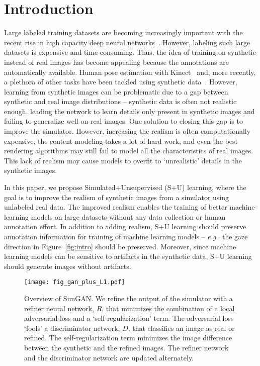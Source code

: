 \documentclass[10pt,twocolumn,letterpaper]{article}
\makeatletter
\DeclareRobustCommand\onedot{\futurelet\@let@token\@onedot}
\def\@onedot{\ifx\@let@token.\else.\null\fi\xspace}
\def\eg{\emph{e.g}\onedot} \def\Eg{\emph{E.g}\onedot}
\makeatother
\begin{document}
\section{Introduction}

Large labeled training datasets are becoming increasingly important with the recent rise in high capacity deep neural networks~\cite{imagenet_cvpr09, mscoco, ZhangLL16, ZhangLL16, youtub8M_16, Nagaraja2016, openimages}.
However, labeling such large datasets is expensive and time-consuming.
Thus, the idea of training on synthetic instead of real images has become appealing because the annotations are automatically available. 
Human pose estimation with Kinect~\cite{Shotton13} and, more recently, a plethora of other tasks have been tackled using synthetic data~\cite{Wood16,Wang15,qiu2016unrealcv,Shafaei16}.
However, learning from synthetic images can be problematic due to a gap between synthetic and real image distributions -- synthetic data is often not realistic enough, leading the network to learn details only present in synthetic images and failing to generalize well on real images.
One solution to closing this gap is to improve the simulator.
However, increasing the realism is often computationally expensive, the content modeling takes a lot of hard work, and even the best rendering algorithms may still fail to model all the characteristics of real images. 
This lack of realism may cause models to overfit to `unrealistic' details in the synthetic images.

In this paper, we propose Simulated+Unsupervised (S+U) learning, where the goal is to improve the realism of synthetic images from a simulator using unlabeled real data.
The improved realism enables the training of better machine learning models on large datasets without any data collection or human annotation effort. 
In addition to adding realism, S+U learning should preserve annotation information for training of machine learning models -- \eg the gaze direction in Figure~\ref{fig:intro} should be preserved.
Moreover, since machine learning models can be sensitive to artifacts in the synthetic data, S+U learning should generate images without artifacts.

\begin{figure}
\centering
\texttt{[image: fig\_gan\_plus\_L1.pdf]}
\caption{Overview of SimGAN. 
We refine the output of the simulator with a refiner neural network, $R$, that minimizes the combination of a local adversarial loss and a `self-regularization' term. 
The adversarial loss `fools' a discriminator network, $D$, that classifies an image as real or refined. 
The self-regularization term minimizes the image difference between the synthetic and the refined images. 
The refiner network and the discriminator network are updated alternately.}
\label{fig:method_overview}
\end{figure}
\end{document}
